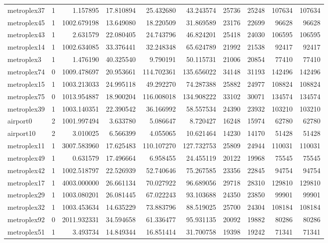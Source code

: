 \begin{longtable}{|l|r|r|r|r|r|r|r|r|r|}
metroplex37 & 1 & 1.157895 & 17.810894 & 25.432680 & 43.243574 & 25736 & 25248 & 107634 & 107634 \\
metroplex45 & 1 & 1002.679198 & 13.649080 & 18.220509 & 31.869589 & 23176 & 22699 & 96628 & 96628 \\
metroplex43 & 1 & 2.631579 & 22.080405 & 24.743796 & 46.824201 & 25418 & 24030 & 106595 & 106595 \\
metroplex14 & 1 & 1002.634085 & 33.376441 & 32.248348 & 65.624789 & 21992 & 21538 & 92417 & 92417 \\
metroplex3 & 1 & 1.476190 & 40.325540 & 9.790191 & 50.115731 & 21006 & 20854 & 77410 & 77410 \\
metroplex74 & 0 & 1009.478697 & 20.953661 & 114.702361 & 135.656022 & 34148 & 31193 & 142496 & 142496 \\
metroplex15 & 1 & 1003.213033 & 24.995118 & 49.292270 & 74.287388 & 25882 & 24977 & 108824 & 108824 \\
metroplex75 & 0 & 1013.954887 & 18.900204 & 116.008018 & 134.908222 & 33102 & 30071 & 134574 & 134574 \\
metroplex39 & 1 & 1003.140351 & 22.390542 & 36.166992 & 58.557534 & 24390 & 23932 & 103210 & 103210 \\
airport0 & 2 & 1001.997494 & 3.633780 & 5.086647 & 8.720427 & 16248 & 15974 & 62780 & 62780 \\
airport10 & 2 & 3.010025 & 6.566399 & 4.055065 & 10.621464 & 14230 & 14170 & 51428 & 51428 \\
metroplex11 & 1 & 3007.583960 & 17.625483 & 110.107270 & 127.732753 & 25809 & 24944 & 110031 & 110031 \\
metroplex49 & 1 & 0.631579 & 17.496664 & 6.958455 & 24.455119 & 20122 & 19968 & 75545 & 75545 \\
metroplex42 & 1 & 1002.518797 & 22.526939 & 52.740646 & 75.267585 & 23356 & 22845 & 94754 & 94754 \\
metroplex17 & 1 & 4003.000000 & 26.661134 & 70.027922 & 96.689056 & 29718 & 28310 & 129810 & 129810 \\
metroplex29 & 1 & 1003.080201 & 26.081445 & 67.022243 & 93.103688 & 24350 & 23850 & 99901 & 99901 \\
metroplex32 & 1 & 1003.453634 & 14.635229 & 73.883796 & 88.519025 & 25700 & 24304 & 108184 & 108184 \\
metroplex92 & 0 & 2011.932331 & 34.594658 & 61.336477 & 95.931135 & 20092 & 19882 & 80286 & 80286 \\
metroplex51 & 1 & 3.493734 & 14.849344 & 16.851414 & 31.700758 & 19398 & 19242 & 71341 & 71341 \\

\end{longtable}
